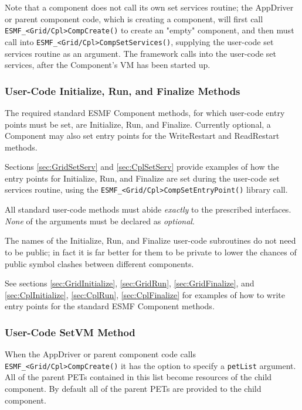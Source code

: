 Note that a component does not call its own set services routine;
the AppDriver or parent component code, which is creating a component, 
will first call {\tt ESMF\_<Grid/Cpl>CompCreate()} to create an "empty" 
component, and then must call into {\tt ESMF\_<Grid/Cpl>CompSetServices()}, 
supplying the user-code set services routine as an argument. The framework
calls into the user-code set services, after the Component's VM has been
started up.


\subsubsection{User-Code Initialize, Run, and Finalize Methods}

The required standard ESMF Component methods, for which user-code entry
points must be set, are Initialize, Run, and Finalize. Currently optional,
a Component may also set entry points for the WriteRestart and
ReadRestart methods.

Sections \ref{sec:GridSetServ} and \ref{sec:CplSetServ} provide examples
of how the entry points for Initialize, Run, and Finalize are set during
the user-code set services routine, using the 
{\tt ESMF\_<Grid/Cpl>CompSetEntryPoint()} library call.

All standard user-code methods must abide {\em exactly} to the prescribed
interfaces. {\em None} of the arguments must be declared as {\em optional}.

The names of the Initialize, Run, and Finalize user-code subroutines do
not need to be public; in fact it is far better for them to be private to
lower the chances of public symbol clashes between different components.

See sections \ref{sec:GridInitialize}, \ref{sec:GridRun},
\ref{sec:GridFinalize}, and \ref{sec:CplInitialize}, \ref{sec:CplRun},
\ref{sec:CplFinalize} for examples of how to write entry points for the 
standard ESMF Component methods.


\subsubsection{User-Code SetVM Method}
\label{sec:AppDriverSetVM}

When the AppDriver or parent component code calls
{\tt ESMF\_<Grid/Cpl>CompCreate()} it has the option to specify a 
{\tt petList} argument. All of the parent PETs contained in this list become
resources of the child component. By default all of the parent PETs are 
provided to the child component.

